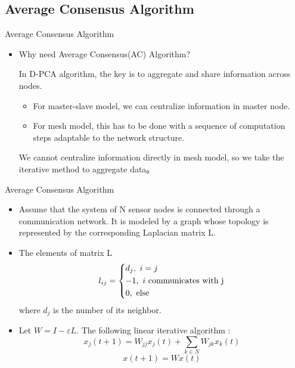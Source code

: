 \documentclass{beamer}
\begin{document}
\subsection{Average Consensus Algorithm}

\begin{frame}{Average Consensus Algorithm}
	\begin{itemize}
		\item{
			Why need Average Consensus(AC) Algorithm?
			
			In D-PCA algorithm, the key is to aggregate and share information across nodes.
			
			\begin{itemize}
				\item{
					For master-slave model, we can centralize information in master node.
				}
				\item{
					For mesh model, this has to be done with a sequence of computation steps adaptable to the network structure.
				}
			\end{itemize}
		
			
			We cannot centralize information directly in mesh model, so we take the iterative method to aggregate data。
		}
	\end{itemize}
\end{frame}

\begin{frame}{Average Consensus Algorithm}
	\begin{itemize}
		\item{
			Assume that the system of N sensor nodes is connected through a communication network. It is  modeled by a graph whose topology is represented by the corresponding Laplacian matrix L.\cite{1}
		}
		\item{
			The elements of matrix L \cite{2}
			\[{l_{ij}} = \left\{ \begin{gathered}
  {d_j},{\text{ }}i = j \hfill \\
   - 1,{\text{ }}i{\text{ communicates with j}} \hfill \\
  0,{\text{ else}} \hfill \\ 
\end{gathered}  \right.\]
			where $ {d}_{j} $ is the number of its neighbor.
		}
		\item{
		Let $ W = I - \varepsilon L $. The following linear iterative algorithm :
		\[{x_j}(t + 1) = {W_{jj}}{x_j}(t) + \sum\limits_{k \in N} {{W_{jk}}{x_k}(t)} \]
		\[x(t + 1) = Wx(t)\]
		}
	\end{itemize}
\end{frame}
\end{document}

